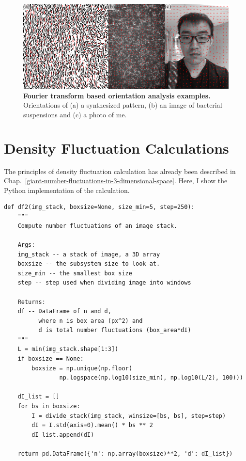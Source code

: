 \begin{figure}[h]
	\begin{center}
	\includegraphics[width=5.5in]{Figs/A-2/oft-gallery.pdf}
	\end{center}
	\caption[Fourier transform based orientation analysis examples]
	{
	\textbf{Fourier transform based orientation analysis examples.}
  Orientations of
  (a) a synthesized pattern,
  (b) an image of bacterial suspensions and
  (c) a photo of me.
	}
	\label{fig:oft-gallery}
\end{figure}

\section{Density Fluctuation Calculations}
\label{sec:A-df-calculation}
The principles of density fluctuation calculation has already been described in Chap.~\ref{giant-number-fluctuations-in-3-dimensional-space}. Here, I show the Python implementation of the calculation.

\begin{verbatim}
def df2(img_stack, boxsize=None, size_min=5, step=250):
    """
    Compute number fluctuations of an image stack.

    Args:
    img_stack -- a stack of image, a 3D array
    boxsize -- the subsystem size to look at.
    size_min -- the smallest box size
    step -- step used when dividing image into windows

    Returns:
    df -- DataFrame of n and d,
          where n is box area (px^2) and
          d is total number fluctuations (box_area*dI)
    """
    L = min(img_stack.shape[1:3])
    if boxsize == None:
        boxsize = np.unique(np.floor(
                np.logspace(np.log10(size_min), np.log10(L/2), 100)))

    dI_list = []
    for bs in boxsize:
        I = divide_stack(img_stack, winsize=[bs, bs], step=step)
        dI = I.std(axis=0).mean() * bs ** 2
        dI_list.append(dI)

    return pd.DataFrame({'n': np.array(boxsize)**2, 'd': dI_list})
\end{verbatim}
